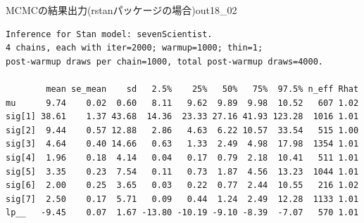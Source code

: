 \begin{SCrstan}{MCMCの結果出力(rstanパッケージの場合)}{out18_02}
	\begin{verbatim}
Inference for Stan model: sevenScientist.
4 chains, each with iter=2000; warmup=1000; thin=1; 
post-warmup draws per chain=1000, total post-warmup draws=4000.

        mean se_mean    sd   2.5%    25%   50%   75%  97.5% n_eff Rhat
mu      9.74    0.02  0.60   8.11   9.62  9.89  9.98  10.52   607 1.02
sig[1] 38.61    1.37 43.68  14.36  23.33 27.16 41.93 123.28  1016 1.01
sig[2]  9.44    0.57 12.88   2.86   4.63  6.22 10.57  33.54   515 1.00
sig[3]  4.64    0.40 14.66   0.63   1.33  2.49  4.98  17.98  1354 1.01
sig[4]  1.96    0.18  4.14   0.04   0.17  0.79  2.18  10.41   511 1.01
sig[5]  3.35    0.23  7.54   0.11   0.73  1.87  4.56  13.23  1044 1.01
sig[6]  2.00    0.25  3.65   0.03   0.22  0.77  2.44  10.55   216 1.02
sig[7]  2.50    0.17  5.71   0.09   0.44  1.24  2.49  12.28  1133 1.01
lp__   -9.45    0.07  1.67 -13.80 -10.19 -9.10 -8.39  -7.07   570 1.01
    \end{verbatim}
\end{SCrstan}
